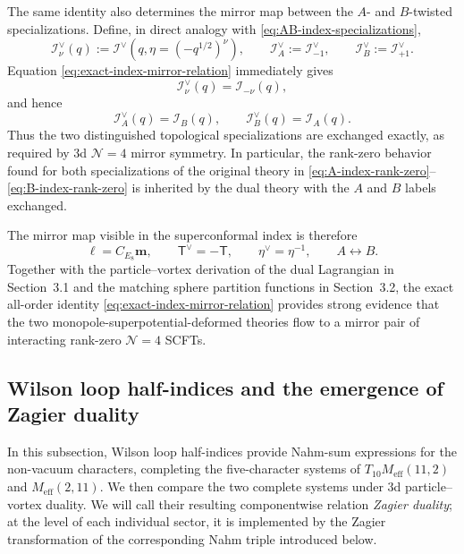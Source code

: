 \documentclass[11pt,a4paper]{article}
\numberwithin{equation}{section}
\begin{document}
The same identity also determines the mirror map between the $A$- and $B$-twisted specializations.  Define, in direct analogy with \eqref{eq:AB-index-specializations},
\begin{equation}
  \mathcal I_\nu^\vee(q)
  :=\mathcal I^\vee\!\left(
    q,\eta=\left(-q^{1/2}\right)^\nu
  \right),
  \qquad
  \mathcal I_A^\vee:=\mathcal I_{-1}^\vee,
  \qquad
  \mathcal I_B^\vee:=\mathcal I_{+1}^\vee.
  \label{eq:dual-AB-index-specializations}
\end{equation}
Equation \eqref{eq:exact-index-mirror-relation} immediately gives
\begin{equation}
  \mathcal I_\nu^\vee(q)=\mathcal I_{-\nu}(q),
  \label{eq:dual-index-nu-map}
\end{equation}
and hence
\begin{equation}
  \mathcal I_A^\vee(q)=\mathcal I_B(q),
  \qquad
  \mathcal I_B^\vee(q)=\mathcal I_A(q).
  \label{eq:AB-index-exchange}
\end{equation}
Thus the two distinguished topological specializations are exchanged exactly, as required by 3d $\mathcal N=4$ mirror symmetry.  In particular, the rank-zero behavior found for both specializations of the original theory in \eqref{eq:A-index-rank-zero}--\eqref{eq:B-index-rank-zero} is inherited by the dual theory with the $A$ and $B$ labels exchanged.

The mirror map visible in the superconformal index is therefore
\begin{equation}
  \boldsymbol\ell=C_{E_8}\boldsymbol m,
  \qquad
  \mathsf T^\vee=-\mathsf T,
  \qquad
  \eta^\vee=\eta^{-1},
  \qquad
  A\longleftrightarrow B.
  \label{eq:SCI-mirror-map-summary}
\end{equation}
Together with the particle--vortex derivation of the dual Lagrangian in Section~3.1 and the matching sphere partition functions in Section~3.2, the exact all-order identity \eqref{eq:exact-index-mirror-relation} provides strong evidence that the two monopole-superpotential-deformed theories flow to a mirror pair of interacting rank-zero $\mathcal N=4$ SCFTs.


\subsection{Wilson loop half-indices and the emergence of Zagier duality}
\label{subsec:dual-Wilson-Zagier}

In this subsection, Wilson loop half-indices provide Nahm-sum expressions for the non-vacuum characters, completing the five-character systems of $T_{10}M_{\mathrm{eff}}(11,2)$ and $M_{\mathrm{eff}}(2,11)$.  We then compare the two complete systems under 3d particle--vortex duality.  We will call their resulting componentwise relation \emph{Zagier duality}; at the level of each individual sector, it is implemented by the Zagier transformation of the corresponding Nahm triple introduced below.
\end{document}

